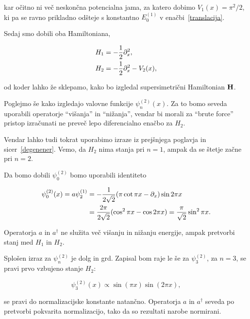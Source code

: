 kar o\v citno ni ve\v c neskon\v cna potencialna jama, za katero dobimo $V_1(x) = \pi^2/2$, ki pa se ravno
prikladno od\v steje s konstantno $E_0^{(1)}$ v ena\v cbi~\eqref{translacija}.

Sedaj smo dobili oba Hamiltoniana,

\begin{align}
	H_1 &= -\frac{1}{2}\partial_x^2, \notag \\
	H_2 &= -\frac{1}{2}\partial_x^2 - V_2(x),
\end{align}

od koder lahko \v ze sklepamo, kako bo izgledal supersimetri\v cni Hamiltonian $\mathbf{H}$.

Poglejmo \v se kako izgledajo valovne funkcije $\psi_n^{(2)}(x)$. Za to bomo seveda uporabili
operatorje "`vi\v sanja"' in "`ni\v zanja"', vendar bi morali za "`brute force"' pristop
izra\v cunati ne preve\v c lepo diferencialno ena\v cbo za $H_2$.

Vendar lahko tudi tokrat uporabimo izraze iz prej\v snjega poglavja in sicer~\eqref{degenener}.
Vemo, da $H_2$ nima stanja pri $n = 1$, ampak da se \v stetje za\v cne pri $n = 2$.

Da bomo dobili $\psi_0^{(2)}$ bomo uporabili identiteto

\begin{align}
	\psi_0^{(2)} (x) = a\psi_2^{(1)} &= -\frac{1}{2\sqrt{2}}(\pi \cot \pi x -
		\partial_x)\sin2\pi x \\
	&= \frac{2\pi}{2\sqrt{2}}(\cos^2\pi x - \cos 2\pi x) = \frac{\pi}{\sqrt{2}}\sin^2\pi x.
\end{align}

Operatorja $a$ in $a^\dagger$ ne slu\v zita ve\v c vi\v sanju in ni\v zanju energije, ampak
pretvorbi stanj med $H_1$ in $H_2$.

Splo\v sen izraz za $\psi_n^{(2)}$ je dolg in grd. Zapisal bom raje le \v se za
$\psi_3^{(2)}$, za $n=3$, se pravi prvo vzbujeno stanje $H_2$:

\begin{equation}
	\psi_3^{(2)}(x) \propto \sin (\pi x) \sin (2\pi x),
\end{equation}

se pravi do normalizacijske konstante natan\v cno. Operatorja $a$ in $a^\dagger$ seveda
po pretvorbi pokvarita normalizacijo, tako da so rezultati narobe normirani.
